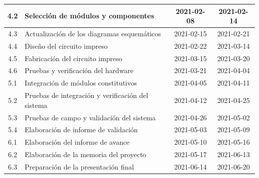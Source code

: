 \documentclass[11pt]{charter}
\begin{document}
\begin{table}[htpb]
\begin{tabularx}{\linewidth}{@{}|c|X|c|c|@{}}
  4.2 & Selección de módulos y componentes & 2021-02-08 & 2021-02-14 \\ \hline
  4.3 & Actualización de los diagramas esquemáticos & 2021-02-15 & 2021-02-21 \\  \hline
  4.4 & Diseño del circuito impreso & 2021-02-22 & 2021-03-14 \\ \hline
  4.5 & Fabricación del circuito impreso & 2021-03-15 & 2021-03-20 \\ \hline
  4.6 & Pruebas y verificación del hardware & 2021-03-21 & 2021-04-04 \\ \hline
  5.1 & Integración de módulos constitutivos & 2021-04-05 & 2021-04-11 \\ \hline
  5.2 & Pruebas de integración y verificación del sistema & 2021-04-12 & 2021-04-25 \\ \hline
  5.3 & Pruebas de campo y validación del sistema & 2021-04-26 & 2021-05-02 \\ \hline
  5.4 & Elaboración de informe de validación & 2021-05-03 & 2021-05-09 \\ \hline
  6.1 & Elaboración del informe de avance & 2021-05-10 & 2021-05-16 \\ \hline
  6.2 & Elaboración de la memoria del proyecto & 2021-05-17 & 2021-06-13 \\ \hline
  6.3 & Preparación de la presentación final & 2021-06-14 & 2021-06-20 \\ \hline
  \end{tabularx}
  \label{tab:gantt}
\end{table}
\end{document}
